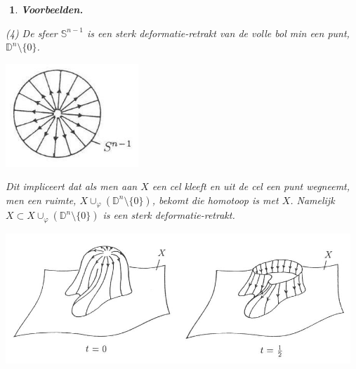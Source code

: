 \documentclass[12pt]{book}
\newcommand{\R}{\mathbb{R}}
\newtheorem{vbnh}[stelh]{$\!\!$}
\newenvironment{vbn}{\begin{vbnh} \em {\bf Voorbeelden.}}{\end{vbnh}}
\newtheorem{dfh}[stelh]{$\!\!$}
\newenvironment{df}{\begin{dfh} \em {\bf Definitie }}{\end{dfh}}
\begin{document}
\begin{vbn}
%
%
%
%



(4) De sfeer $\mathbb{S}^{n-1}$ is een sterk deformatie-retrakt van de volle bol min een punt, $\mathbb{D}^{n}\setminus\{0\}$.

\begin{center}
\includegraphics[width=5cm]{images/diskminpt.jpg}
\end{center}

Dit impliceert dat als men aan $X$ een cel kleeft en uit de cel een punt wegneemt, men een ruimte, $X\cup_{\varphi} (\mathbb{D}^{n}\setminus\{0\})$, bekomt die homotoop is met $X$. Namelijk $X\subset X\cup_{\varphi} (\mathbb{D}^{n}\setminus\{0\})$ is een sterk deformatie-retrakt.

\begin{center}
\includegraphics[width=13cm]{images/retrakt.jpg}
\end{center}




\end{vbn}
\end{document}
